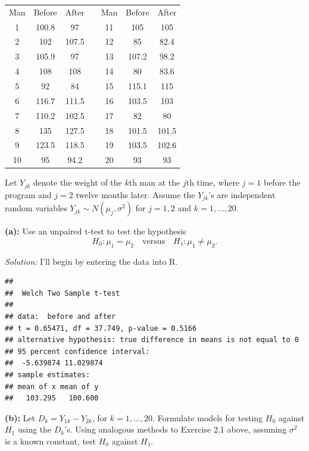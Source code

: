 \documentclass[]{article}
\begin{document}
\begin{center}
\begin{tabular}{@{}ccccccc@{}}
\toprule
Man & Before & After &  & Man & Before & After \\ \cmidrule(r){1-3} \cmidrule(l){5-7} 
1   & 100.8  & 97    &  & 11  & 105    & 105   \\
2   & 102    & 107.5 &  & 12  & 85     & 82.4  \\
3   & 105.9  & 97    &  & 13  & 107.2  & 98.2  \\
4   & 108    & 108   &  & 14  & 80     & 83.6  \\
5   & 92     & 84    &  & 15  & 115.1  & 115   \\
6   & 116.7  & 111.5 &  & 16  & 103.5  & 103   \\
7   & 110.2  & 102.5 &  & 17  & 82     & 80    \\
8   & 135    & 127.5 &  & 18  & 101.5  & 101.5 \\
9   & 123.5  & 118.5 &  & 19  & 103.5  & 102.6 \\
10  & 95     & 94.2  &  & 20  & 93     & 93    \\ \bottomrule
\end{tabular}
\end{center}

Let \(Y_{jk}\) denote the weight of the \(k\)th man at the \(j\)th time,
where \(j = 1\) before the program and \(j = 2\) twelve months later.
Assume the \(Y_{jk}\)'s are independent random variables
\(Y_{jk} \sim N(\mu_j, \sigma^2)\) for \(j = 1,2\) and \(k = 1,...,20\).

\textbf{(a):} Use an unpaired t-test to test the hypothesis \[
H_0 : \mu_1 = \mu_2 \quad \text{versus} \quad H_1: \mu_1 \neq \mu_2.
\]

\emph{Solution: } I'll begin by entering the data into R.

\begin{verbatim}
## 
##  Welch Two Sample t-test
## 
## data:  before and after
## t = 0.65471, df = 37.749, p-value = 0.5166
## alternative hypothesis: true difference in means is not equal to 0
## 95 percent confidence interval:
##  -5.639874 11.029874
## sample estimates:
## mean of x mean of y 
##   103.295   100.600
\end{verbatim}

\textbf{(b):} Let \(D_k = Y_{1k} - Y_{2k}\), for \(k = 1,...,20\).
Formulate models for testing \(H_0\) against \(H_1\) using the
\(D_k\)'s. Using analogous methods to Exercise 2.1 above, assuming
\(\sigma^2\) is a known constant, test \(H_0\) against \(H_1\).
\end{document}
